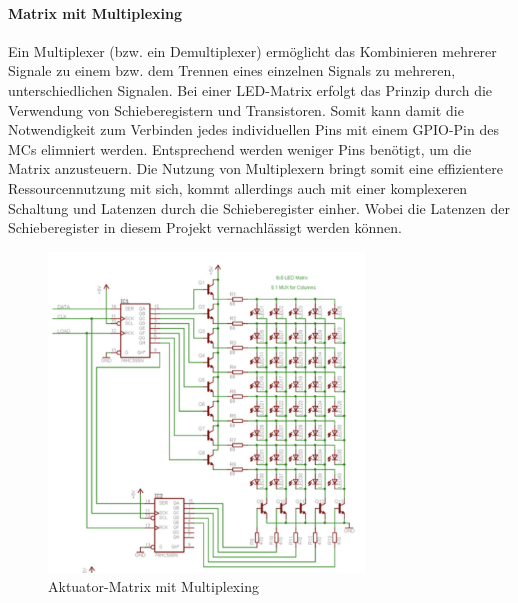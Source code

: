 \paragraph{Matrix mit Multiplexing}
Ein Multiplexer (bzw. ein Demultiplexer) ermöglicht das Kombinieren mehrerer Signale zu einem bzw. dem Trennen eines einzelnen Signals zu mehreren, unterschiedlichen Signalen.
Bei einer LED-Matrix erfolgt das Prinzip durch die Verwendung von Schieberegistern und Transistoren. %
Somit kann damit die Notwendigkeit zum Verbinden jedes individuellen Pins mit einem GPIO-Pin des \ac{MC}s elimniert werden.
Entsprechend werden weniger Pins benötigt, um die Matrix anzusteuern.
Die Nutzung von Multiplexern bringt somit eine effizientere Ressourcennutzung mit sich, kommt allerdings auch mit einer komplexeren Schaltung und Latenzen durch die Schieberegister einher. %
Wobei die Latenzen der Schieberegister in diesem Projekt vernachlässigt werden können.
\begin{figure}[htbp] %
	\centering
	\includegraphics[width=0.75\textwidth]{img/matrixMuxSchaltung}
	\caption{Aktuator-Matrix mit Multiplexing}
	\label{fig:AktMatrixMux}
\end{figure}

